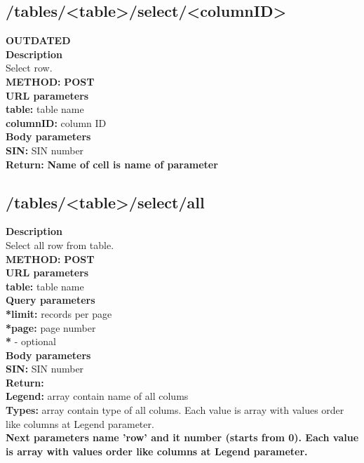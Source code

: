 \documentclass[a4paper, 12pt]{report}
\begin{document}
\subsection{/tables/<table>/select/<columnID>}
\textbf{\color{red} OUTDATED}\\
\textbf{\color{redText} Description} \\
Select row. \\
\textbf{\color{redText} METHOD: } \textbf{POST} \\
\textbf{\color{redText} URL parameters} \\
\textbf{table: } table name\\
\textbf{columnID: } column ID\\
\textbf{\color{redText} Body parameters} \\
\textbf{SIN: } SIN number\\
\textbf{\color{redText} Return: } 
\textbf{Name of cell is name of parameter}\\

\subsection{/tables/<table>/select/all}
\textbf{\color{redText} Description} \\
Select all row from table. \\
\textbf{\color{redText} METHOD: } \textbf{POST} \\
\textbf{\color{redText} URL parameters} \\
\textbf{table: } table name\\
\textbf{\color{redText} Query parameters} \\
\textbf{*limit: } records per page \\
\textbf{*page: } page number \\
\textbf{*} - optional \\
\textbf{\color{redText} Body parameters} \\
\textbf{SIN: } SIN number\\
\textbf{\color{redText} Return: } \\
\textbf{Legend: } array contain name of all colums \\
\textbf{Types: } array contain type of all colums. Each value is array with values order like columns at Legend parameter. \\
\textbf{Next parameters name 'row' and it number (starts from 0). Each value is array with values order like columns at Legend parameter.}\\
\end{document}
